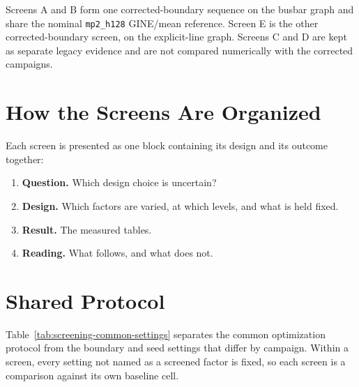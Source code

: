 \noindent Screens A and B form one corrected-boundary sequence on the busbar
graph and share the nominal \texttt{mp2\_h128} GINE/mean reference. Screen E is
the other corrected-boundary screen, on the explicit-line graph. Screens C and
D are kept as separate legacy evidence and are not compared numerically with
the corrected campaigns.



\section{How the Screens Are Organized}
\label{sec:screening-how-to-read}

Each screen is presented as one block containing its design and its outcome
together:

\begin{enumerate}
  \item \textbf{Question.} Which design choice is uncertain?
  \item \textbf{Design.} Which factors are varied, at which levels, and what is
  held fixed.
  \item \textbf{Result.} The measured tables.
  \item \textbf{Reading.} What follows, and what does not.
\end{enumerate}

\section{Shared Protocol}
\label{sec:screening-common-protocol}

Table~\ref{tab:screening-common-settings} separates the common optimization
protocol from the boundary and seed settings that differ by campaign. Within a
screen, every setting not named as a screened factor is fixed, so each screen
is a comparison against its own baseline cell.

